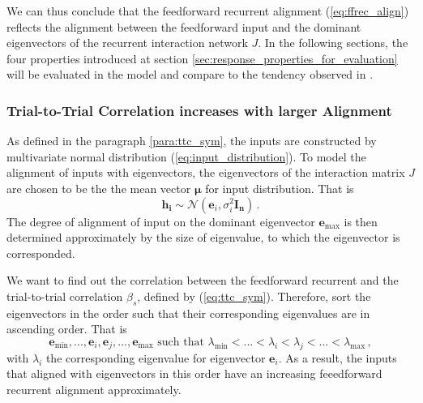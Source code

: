 \documentclass[11pt]{article}
\begin{document}
	We can thus conclude that the feedforward recurrent alignment (\ref{eq:ffrec_align}) reflects the alignment between the feedforward input and the dominant eigenvectors of the recurrent interaction network $J$. In the following sections, the four properties introduced at section \ref{sec:response_properties_for_evaluation} will be evaluated in the model and compare to the tendency observed in \cite{tragenap2023nature}. 
	
	\subsubsection{Trial-to-Trial Correlation increases with larger Alignment}
	
	As defined in the paragraph \ref{para:ttc_sym}, the inputs are constructed by multivariate normal distribution (\ref{eq:input_distribution}). To model the alignment of inputs with eigenvectors, the eigenvectors of the interaction matrix $J$ are chosen to be the the mean vector $\mathbf{\mu}$ for input distribution. That is
		\begin{equation}
			\mathbf{h_i} \sim \mathcal{N} (\mathbf{e}_i, \sigma_i^2\mathbf{I_n}) \, . 
		\end{equation}
	The degree of alignment of input on the dominant eigenvector $\mathbf{e}_{\text{max}}$ is then determined approximately by the size of eigenvalue, to which the eigenvector is corresponded. 
	
	
	We want to find out the correlation between the feedforward recurrent and the trial-to-trial correlation $\beta_s$, defined by (\ref{eq:ttc_sym}). Therefore, sort the eigenvectors in the order such that their corresponding eigenvalues are in ascending order. That is
		\begin{equation} \label{eq:ascending_order}
			\mathbf{e}_{\text{min}}, ..., \mathbf{e}_i, \mathbf{e}_j, ..., \mathbf{e}_{\text{max}} \, \, \text{such that} \, \, \lambda_{\text{min}} < ...< \lambda_i < \lambda_j < ... < \lambda_{\text{max}} \, ,
		\end{equation}
	with $\lambda_i$ the corresponding eigenvalue for eigenvector $\mathbf{e}_i$. As a result, the inputs that aligned with eigenvectors in this order have an increasing feeedforward recurrent alignment approximately. 
	
\end{document}
